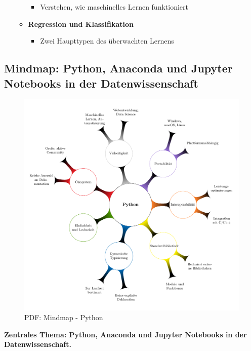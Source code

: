 \documentclass{vorlage-design-main}
\begin{document}
\begin{enumerate}
\begin{itemize}
\begin{itemize}
    \item
      Verstehen, wie maschinelles Lernen funktioniert
    \end{itemize}
  \item
    \textbf{Regression und Klassifikation}

    \begin{itemize}

    \item
      Zwei Haupttypen des überwachten Lernens
    \end{itemize}
  \end{itemize}
\end{enumerate}

\subsection{Mindmap: Python, Anaconda und Jupyter Notebooks in der
Datenwissenschaft}\label{mindmap-python-anaconda-und-jupyter-notebooks-in-der-datenwissenschaft}

\begin{figure}
\centering
\includegraphics[width=0.6\linewidth,keepaspectratio]{images/Mindmap-Python.pdf}
\caption{PDF: Mindmap - Python}
\end{figure}

\textbf{Zentrales Thema: Python, Anaconda und Jupyter Notebooks in der
Datenwissenschaft.}
\end{document}
